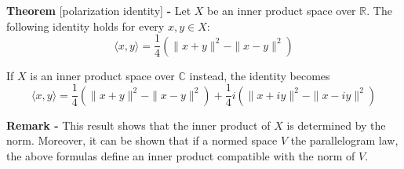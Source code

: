 \documentclass[12pt]{article}
\begin{document}
{\bf Theorem} [polarization identity] {\bf -} Let $X$ be an inner product space over $\mathbb{R}$. The following identity holds for every $x, y \in X$:
\begin{displaymath}
\langle x, y \rangle = \frac{1}{4}(\|x +y \|^2 - \|x-y\|^2)
\end{displaymath}

If $X$ is an inner product space over $\mathbb{C}$ instead, the identity becomes
\begin{displaymath}
\langle x, y \rangle = \frac{1}{4}(\|x +y \|^2 - \|x-y\|^2) + \frac{1}{4}i(\|x+iy\|^2-\|x-iy\|^2)
\end{displaymath}

{\bf Remark -} This result shows that the inner product of $X$ is determined by the norm. Moreover, it can be shown that if a normed space $V$  the parallelogram law, the above formulas define an inner product compatible with the norm of $V$.
\end{document}
